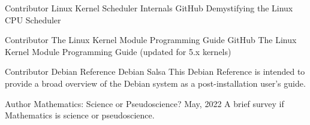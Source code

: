 

\begin{cventries}
  \cventry
  {Contributor} %
  {Linux Kernel Scheduler Internals} %
  {GitHub} %
  {} %
  {Demystifying the Linux CPU Scheduler}

  \cventry
  {Contributor} %
  {The Linux Kernel Module Programming Guide} %
  {GitHub} %
  {} %
  {The Linux Kernel Module Programming Guide (updated for 5.x kernels)}

  \cventry
  {Contributor} %
  {Debian Reference} %
  {Debian Salsa} %
  {} %
  {This Debian Reference is intended to provide a broad overview of the
   Debian system as a post-installation user's guide.}

  \cventry
  {Author} %
  {Mathematics: Science or Pseudoscience?} %
  {} %
  {May, 2022} %
  {A brief survey if Mathematics is science or pseudoscience. }

\end{cventries}
